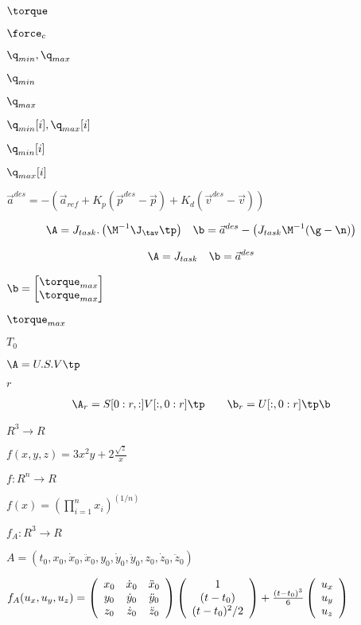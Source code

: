 \documentclass{article}
\begin{document}
$ \torque $
\pagebreak

$ \force_c $
\pagebreak

$ \q_{min}, \q_{max} $
\pagebreak

$ \q_{min} $
\pagebreak

$ \q_{max} $
\pagebreak

$ \q_{min}[i], \q_{max}[i] $
\pagebreak

$ \q_{min}[i] $
\pagebreak

$ \q_{max}[i] $
\pagebreak

$ \vec{a}^{des} = - \left( \vec{a}_{ref} + K_p (\vec{p}^{des} - \vec{p}) + K_d (\vec{v}^{des} - \vec{v}) \right) $
\pagebreak

\begin{align*} \A &= J_{task} . \left( \M^{-1} \J_{\tav}\tp \right) & \b &= \vec{a}^{des} - \left( J_{task} \M^{-1} ( \g - \n) \right) \end{align*}
\pagebreak

\begin{align*} \A &= J_{task} & \b &= \vec{a}^{des} \end{align*}
\pagebreak

$ \b = \begin{bmatrix} \torque_{max} \\ \torque_{max} \end{bmatrix} $
\pagebreak

$ \torque_{max} $
\pagebreak

$ T_0 $
\pagebreak

$ \A = U . S . V\tp $
\pagebreak

$ r $
\pagebreak

\begin{align*} \A_r &= S[0:r, :] V[:, 0:r] \tp & & & \b_r &= U[:, 0:r] \tp \b \end{align*}
\pagebreak

$ R^3 \rightarrow R $
\pagebreak

$ f(x,y,z) = 3x^2y+2\frac{\sqrt{z}}{x}$
\pagebreak

$ f: R^n \rightarrow R $
\pagebreak

$ f(x) = \left(\prod_{i=1}^n x_i\right)^(1/n) $
\pagebreak

$ f_A:R^3 \rightarrow R $
\pagebreak

$ A = \left(t_0, x_0, \dot{x}_0, \ddot{x}_0, y_0, \dot{y}_0, \ddot{y}_0, z_0, \dot{z}_0, \ddot{z}_0 \right) $
\pagebreak

$ f_A(u_x,u_y,u_z) = \left(\begin{array}{c c c} x_0 & \dot{x}_0 & \ddot{x}_0 \\ y_0 & \dot{y}_0 & \ddot{y}_0 \\ z_0 & \dot{z}_0 & \ddot{z}_0 \end{array}\right) \left(\begin{array}{c} 1 \\ (t-t_0) \\ (t-t_0)^2/2 \end{array}\right) + \frac{(t-t_0)^3}{6} \left(\begin{array}{c} u_x \\ u_y \\ u_z \end{array}\right) $
\pagebreak
\end{document}
